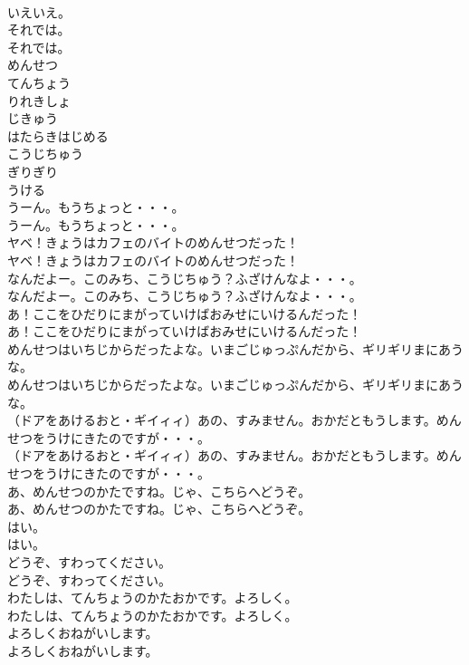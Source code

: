 \documentclass[8pt]{extreport}
\begin{document}
\begin{CJK}{UTF8}{min}
\\	いえいえ。 
\\	それでは。	
\\	それでは。 
\\	めんせつ
\\	てんちょう
\\	りれきしょ
\\	じきゅう
\\	はたらきはじめる
\\	こうじちゅう
\\	ぎりぎり
\\	うける
\\	うーん。もうちょっと・・・。	
\\	うーん。もうちょっと・・・。 
\\	ヤベ！きょうはカフェのバイトのめんせつだった！	
\\	ヤベ！きょうはカフェのバイトのめんせつだった！ 
\\	なんだよー。このみち、こうじちゅう？ふざけんなよ・・・。	
\\	なんだよー。このみち、こうじちゅう？ふざけんなよ・・・。 
\\	あ！ここをひだりにまがっていけばおみせにいけるんだった！	
\\	あ！ここをひだりにまがっていけばおみせにいけるんだった！ 
\\	めんせつはいちじからだったよな。いまごじゅっぷんだから、ギリギリまにあうな。	
\\	めんせつはいちじからだったよな。いまごじゅっぷんだから、ギリギリまにあうな。 
\\	（ドアをあけるおと・ギイィィ）あの、すみません。おかだともうします。めんせつをうけにきたのですが・・・。	
\\	（ドアをあけるおと・ギイィィ）あの、すみません。おかだともうします。めんせつをうけにきたのですが・・・。 
\\	あ、めんせつのかたですね。じゃ、こちらへどうぞ。	
\\	あ、めんせつのかたですね。じゃ、こちらへどうぞ。 
\\	はい。	
\\	はい。 
\\	どうぞ、すわってください。	
\\	どうぞ、すわってください。 
\\	わたしは、てんちょうのかたおかです。よろしく。	
\\	わたしは、てんちょうのかたおかです。よろしく。 
\\	よろしくおねがいします。	
\\	よろしくおねがいします。 

\end{CJK}
\end{document}
